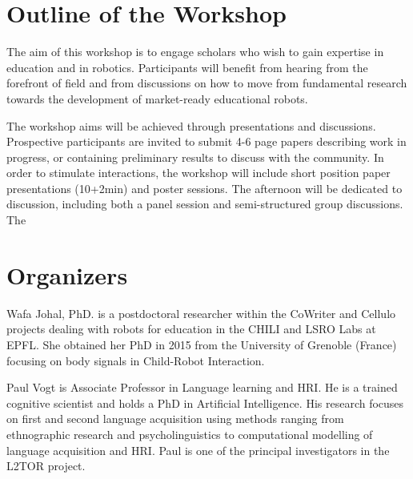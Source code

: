 \documentclass{sig-alternate-05-2015}
\begin{document}

\section{Outline of the Workshop}
The aim of this workshop is to engage scholars who wish to gain expertise in 
education and in robotics. Participants will benefit from hearing from the 
forefront of field and from discussions on how to move from fundamental research 
towards the development of market-ready educational robots.

The workshop aims will be achieved through presentations and discussions. 
Prospective participants are invited to submit 4-6 page papers describing work in progress, or containing preliminary results to discuss with the community.
In order to stimulate interactions, the workshop will include short position paper presentations (10+2min) and poster sessions. 
The afternoon will be dedicated to discussion, including both a panel session and semi-structured group discussions.
The 

\section{Organizers}
Wafa Johal, PhD. is a postdoctoral researcher within the CoWriter and Cellulo projects dealing with robots for education in the CHILI and LSRO Labs at EPFL. She obtained her PhD in 2015 from the University of Grenoble (France) focusing on body signals in Child-Robot Interaction.  

Paul Vogt is Associate Professor in Language learning and HRI. He is a trained cognitive scientist and holds a PhD in Artificial Intelligence. His research focuses on first and second language acquisition using methods ranging from ethnographic research and psycholinguistics to computational modelling of language acquisition and HRI. Paul is one of the principal investigators in the L2TOR project.
\end{document}
